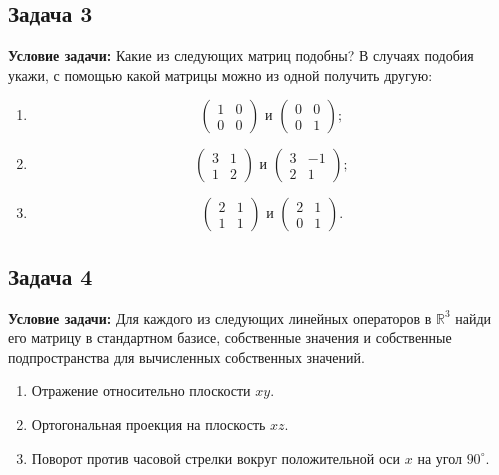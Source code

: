 \documentclass[a4paper,12pt]{article}
\begin{document}
\subsection{Задача 3}
\textbf{Условие задачи:} Какие из следующих матриц подобны? В случаях подобия укажи, с помощью какой матрицы можно из одной получить другую:
\begin{enumerate}
    \item 
    \[
    \begin{pmatrix}
    1 & 0 \\
    0 & 0
    \end{pmatrix}
    \text{ и }
    \begin{pmatrix}
    0 & 0 \\
    0 & 1
    \end{pmatrix};
    \]
    \item 
    \[
    \begin{pmatrix}
    3 & 1 \\
    1 & 2
    \end{pmatrix}
    \text{ и }
    \begin{pmatrix}
    3 & -1 \\
    2 & 1
    \end{pmatrix};
    \]
    \item 
    \[
    \begin{pmatrix}
    2 & 1 \\
    1 & 1
    \end{pmatrix}
    \text{ и }
    \begin{pmatrix}
    2 & 1 \\
    0 & 1
    \end{pmatrix}.
    \]
\end{enumerate}

\subsection{Задача 4}
\textbf{Условие задачи:} Для каждого из следующих линейных операторов в $\mathbb{R}^3$ найди его матрицу в стандартном базисе, собственные значения и собственные подпространства для вычисленных собственных значений.
\begin{enumerate}
    \item Отражение относительно плоскости $xy$.
    \item Ортогональная проекция на плоскость $xz$.
    \item Поворот против часовой стрелки вокруг положительной оси $x$ на угол $90^\circ$.
\end{enumerate}
\end{document}
